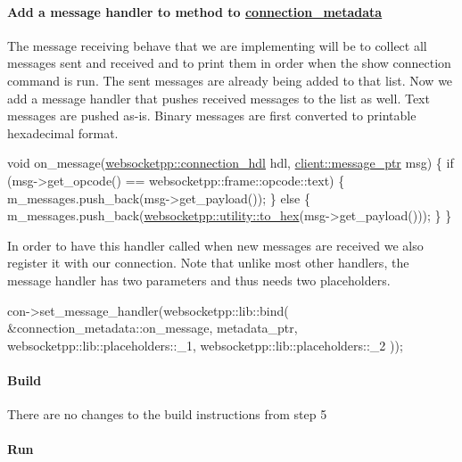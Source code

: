 \paragraph*{Add a message handler to method to {\ttfamily \hyperlink{classconnection__metadata}{connection\+\_\+metadata}}}

The message receiving behave that we are implementing will be to collect all messages sent and received and to print them in order when the show connection command is run. The sent messages are already being added to that list. Now we add a message handler that pushes received messages to the list as well. Text messages are pushed as-\/is. Binary messages are first converted to printable hexadecimal format.


\begin{DoxyCode}
\textcolor{keywordtype}{void} on\_message(\hyperlink{namespacewebsocketpp_a6b3d26a10ee7229b84b776786332631d}{websocketpp::connection\_hdl} hdl, 
      \hyperlink{classwebsocketpp_1_1endpoint_a585ecbbfd9689d4e4229e4c8378bd672}{client::message\_ptr} msg) \{
    \textcolor{keywordflow}{if} (msg->get\_opcode() == websocketpp::frame::opcode::text) \{
        m\_messages.push\_back(msg->get\_payload());
    \} \textcolor{keywordflow}{else} \{
        m\_messages.push\_back(\hyperlink{namespacewebsocketpp_1_1utility_a26e5a26395d95d2f6bf3a9edb8d06dd2}{websocketpp::utility::to\_hex}(msg->get\_payload()));
    \}
\}
\end{DoxyCode}


In order to have this handler called when new messages are received we also register it with our connection. Note that unlike most other handlers, the message handler has two parameters and thus needs two placeholders.


\begin{DoxyCode}
con->set\_message\_handler(websocketpp::lib::bind(
    &connection\_metadata::on\_message,
    metadata\_ptr,
    websocketpp::lib::placeholders::\_1,
    websocketpp::lib::placeholders::\_2
));
\end{DoxyCode}


\paragraph*{Build}

There are no changes to the build instructions from step 5

\paragraph*{Run}

